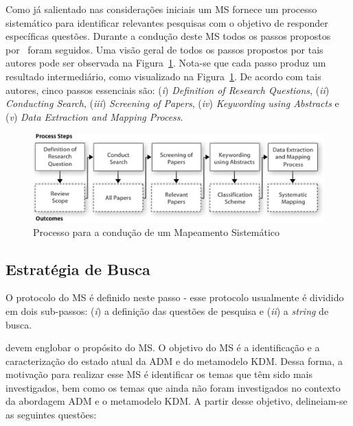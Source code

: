 Como já salientado nas considerações iniciais um MS fornece um processo sistemático para identificar relevantes pesquisas com o objetivo de responder específicas questões. Durante a condução deste MS todos os passos propostos por~ foram seguidos. Uma visão geral de todos os passos propostos por tais autores pode ser observada na Figura~\ref{fig:all_steps_MS}. Nota-se que cada passo produz um resultado intermediário, como visualizado na Figura~\ref{fig:all_steps_MS}. De acordo com tais autores, cinco passos essenciais são: (\textit{i}) \textit{Definition of Research Questions}, (\textit{ii}) \textit{Conducting Search}, (\textit{iii}) \emph{Screening of Papers}, (\textit{iv}) \emph{Keywording using Abstracts} e (\textit{v}) \textit{Data Extraction and Mapping Process}. 

\begin{figure}[h]
 \caption{Processo para a condução de um Mapeamento Sistemático}
 \label{fig:all_steps_MS}
 \centering
 \includegraphics[scale=0.3]{images/systematic_mapping_process}
\end{figure}

\subsection{Estratégia de Busca}\label{subsec:estrategia_de_busca}

O protocolo do MS é definido neste passo - esse protocolo usualmente é dividido em dois sub-passos: (\textit{i}) a definição das questões de pesquisa e (\textit{ii}) a \textit{string} de busca. 

 devem englobar o propósito do MS. O objetivo do MS é a identificação e a caracterização do estado atual da ADM e do metamodelo KDM. Dessa forma, a motivação para realizar esse MS é identificar os temas que têm sido mais investigados, bem como os temas que ainda não foram investigados no contexto da abordagem ADM e o metamodelo KDM. A partir desse objetivo, delineiam-se as seguintes questões:

